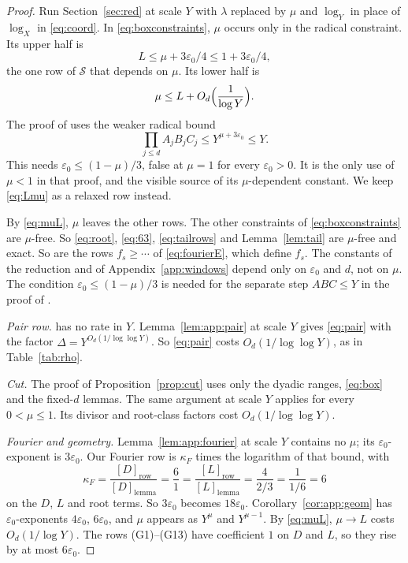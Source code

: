 \documentclass{amsart}
\theoremstyle{definition}
\theoremstyle{plain}
\numberwithin{equation}{section}
\numberwithin{table}{section}
\begin{document}
\begin{proof}
Run Section~\ref{sec:red} at scale $Y$ with $\lambda$ replaced by $\mu$ and
$\log_Y$ in place of $\log_X$ in \eqref{eq:coord}. In
\eqref{eq:boxconstraints}, $\mu$ occurs only in the radical constraint. Its
upper half is
\begin{equation}\label{eq:Lmu}
 L\le\mu+3\varepsilon_0/4\le1+3\varepsilon_0/4,
\end{equation}
the one row of $\mathcal S$ that depends on $\mu$. Its lower half is
\begin{equation}\label{eq:muL}
 \mu\le L+O_d\Bigl(\frac1{\log Y}\Bigr).
\end{equation}
The proof of \cite[Theorem~1.3]{BBLT} uses the weaker radical bound
\[
 \prod_{j\le d}A_jB_jC_j\le Y^{\mu+3\varepsilon_0}\le Y.
\]
This needs $\varepsilon_0\le(1-\mu)/3$, false at $\mu=1$ for every
$\varepsilon_0>0$. It is the only use of $\mu<1$ in that proof, and the
visible source of its $\mu$-dependent constant. We
keep \eqref{eq:Lmu} as a relaxed row instead.

By \eqref{eq:muL}, $\mu$ leaves the other rows. The other constraints of
\eqref{eq:boxconstraints} are $\mu$-free. So \eqref{eq:root}, \eqref{eq:63},
\eqref{eq:tailrows} and Lemma~\ref{lem:tail} are $\mu$-free and exact. So are
the rows $f_s\ge\cdots$ of \eqref{eq:fourierE}, which define $f_s$. The
constants of the reduction and of Appendix~\ref{app:windows} depend only on
$\varepsilon_0$ and $d$, not on $\mu$. The condition
$\varepsilon_0\le(1-\mu)/3$ is needed for the separate step $ABC\le Y$ in the
proof of \cite[Theorem~1.3]{BBLT}.

\emph{Pair row.} \cite[Proposition~2.3]{BBLT} has no rate in $Y$.
Lemma~\ref{lem:app:pair} at scale $Y$ gives \eqref{eq:pair} with the factor
$\Delta=Y^{O_d(1/\log\log Y)}$. So \eqref{eq:pair} costs
$O_d(1/\log\log Y)$, as in Table~\ref{tab:rho}.

\emph{Cut.} The proof of Proposition~\ref{prop:cut} uses only the dyadic
ranges, \eqref{eq:box} and the fixed-$d$ lemmas. The same argument at scale
$Y$ applies for every $0<\mu\le1$. Its divisor and root-class factors cost
$O_d(1/\log\log Y)$.

\emph{Fourier and geometry.} Lemma~\ref{lem:app:fourier} at scale $Y$
contains no $\mu$; its $\varepsilon_0$-exponent is $3\varepsilon_0$. Our
Fourier row is $\kappa_F$ times the logarithm of that bound, with
\[
 \kappa_F=\frac{[D]_{\text{row}}}{[D]_{\text{lemma}}}=\frac61
 =\frac{[L]_{\text{row}}}{[L]_{\text{lemma}}}=\frac{4}{2/3}=\frac1{1/6}=6
\]
on the $D$, $L$ and root terms. So $3\varepsilon_0$ becomes $18\varepsilon_0$.
Corollary~\ref{cor:app:geom} has $\varepsilon_0$-exponents $4\varepsilon_0$,
$6\varepsilon_0$, and $\mu$ appears as $Y^{\mu}$ and $Y^{\mu-1}$. By
\eqref{eq:muL}, $\mu\to L$ costs $O_d(1/\log Y)$. The rows (G1)--(G13) have
coefficient $1$ on $D$ and $L$, so they rise by at most $6\varepsilon_0$.


\end{proof}
\end{document}
